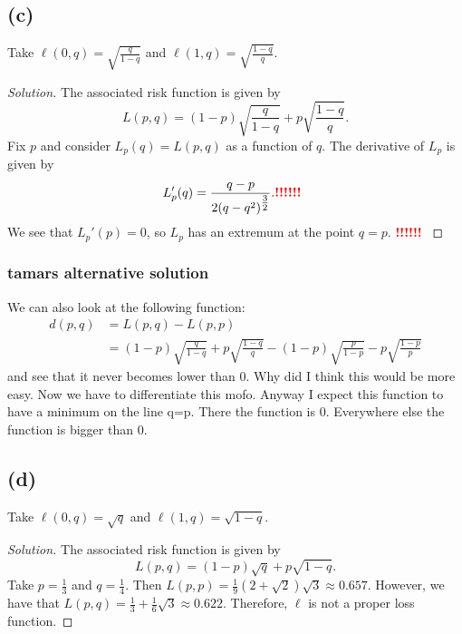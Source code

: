 \documentclass[10pt, a4paper, twoside]{amsart}
\newenvironment{solution}
               {\let\oldqedsymbol=\qedsymbol
                \renewcommand{\qedsymbol}{$\blacktriangleleft$}
                \begin{proof}[Solution]}
               {\end{proof}
                \renewcommand{\qedsymbol}{\oldqedsymbol}}
\newcommand{\TODO}{\textcolor{red}{\textbf{!!!!!! }}}
\begin{document}
\subsection*{(c)}
Take $\ell(0,q)=\sqrt{\frac{q}{1-q}}$ and $\ell(1,q)=\sqrt{\frac{1-q}{q}}$.
\begin{solution}
The associated risk function is given by
\begin{equation*}
L(p,q)=(1-p)\sqrt{\frac{q}{1-q}}+p\sqrt{\frac{1-q}{q}}.
\end{equation*}
Fix $p$ and consider $L_p(q)=L(p,q)$ as a function of $q$.
The derivative of $L_p$ is given by
\begin{equation*}
L_p'(q)=\frac{q-p}{2(q-q^2)^{\tfrac{3}{2}}}. \TODO
\end{equation*}
We see that $L_p'(p)=0$, so $L_p$ has an extremum at the point $q=p$. \TODO
\end{solution}

\subsubsection*{tamars alternative solution}
We can also look at the following function:
\begin{align*}
  d(p,q) & = L(p,q)-L(p,p)\\
         & = (1-p)\sqrt{\frac{q}{1-q}}+p\sqrt{\frac{1-q}{q}} - (1-p)\sqrt{\frac{p}{1-p}} - p\sqrt{\frac{1-p}{p}}
\end{align*}
and see that it never becomes lower than 0.
Why did I think this would be more easy.
Now we have to differentiate this mofo.
Anyway I expect this function to have a minimum on the line q=p. There the function is 0. Everywhere else the function is bigger than 0.

\subsection*{(d)}
Take $\ell(0,q)=\sqrt{q}$ and $\ell(1,q)=\sqrt{1-q}$.
\begin{solution}
The associated risk function is given by
\begin{equation*}
L(p,q)=(1-p)\sqrt{q}+p\sqrt{1-q}.
\end{equation*}
Take $p=\tfrac{1}{3}$ and $q=\tfrac{1}{4}$. Then $L(p,p)= \tfrac{1}{9}(2+\sqrt{2})\sqrt{3}\approx 0.657$.
However, we have that $L(p,q)=\tfrac{1}{3}+\tfrac{1}{6}\sqrt{3} \approx 0.622$.
Therefore, $\ell$ is not a proper loss function.
\end{solution}
\end{document}
